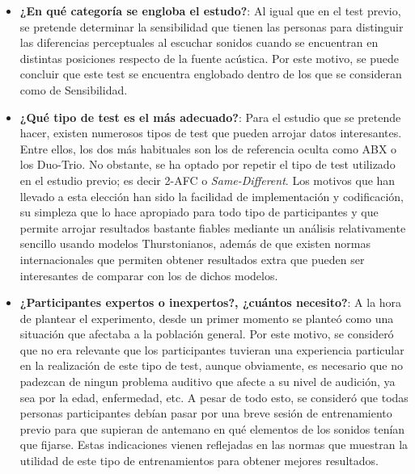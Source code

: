 \documentclass[11pt,a4paper,twoside]{book}
\begin{document}
                \begin{itemize}
                
                    \item \textbf{¿En qué categoría se engloba el estudo?}: Al igual que en el test previo, se pretende determinar la sensibilidad que tienen las personas para distinguir las diferencias perceptuales al escuchar sonidos cuando se encuentran en distintas posiciones respecto de la fuente acústica. Por este motivo, se puede concluir que este test se encuentra englobado dentro de los que se consideran como de Sensibilidad.
                    \item \textbf{¿Qué tipo de test es el más adecuado?}: Para el estudio que se pretende hacer, existen numerosos tipos de test que pueden arrojar datos interesantes. Entre ellos, los dos más habituales son los de referencia oculta como ABX o los Duo-Trio. No obstante, se ha optado por repetir el tipo de test utilizado en el estudio previo; es decir 2-AFC o \textit{Same-Different}. Los motivos que han llevado a esta elección han sido la facilidad de implementación y codificación, su simpleza que lo hace apropiado para todo tipo de participantes y que permite arrojar resultados bastante fiables mediante un análisis relativamente sencillo usando modelos Thurstonianos, además de que existen normas internacionales que permiten obtener resultados extra que pueden ser interesantes de comparar con los de dichos modelos.
                    \item \textbf{¿Participantes expertos o inexpertos?, ¿cuántos necesito?}: A la hora de plantear el experimento, desde un primer momento se planteó como una situación que afectaba a la población general. Por este motivo, se consideró que no era relevante que los participantes tuvieran una experiencia particular en la realización de este tipo de test, aunque obviamente, es necesario que no padezcan de ningun problema auditivo que afecte a su nivel de audición, ya sea por la edad, enfermedad, etc. A pesar de todo esto, se consideró que todas personas participantes debían pasar por una breve sesión de entrenamiento previo para que supieran de antemano en qué elementos de los sonidos tenían que fijarse. Estas indicaciones vienen reflejadas en las normas \cite{UIT1116, UIT1534, UIT1284, EBU3286, UIT1285, UIT1286} que muestran la utilidad de este tipo de entrenamientos para obtener mejores resultados.
                

\end{itemize}
\end{document}
